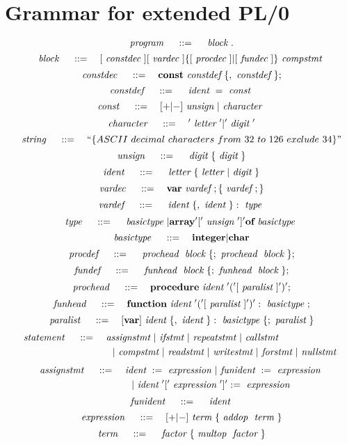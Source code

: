 \section{Grammar for extended PL/0}
\label{sec:gfepl0}

\[
	~\emph{program}~ \quad ::= \quad 
		~\emph{block}~.
\]
\[
	~\emph{block}~ \quad ::= \quad 
		[~\emph{constdec}~] [~\emph{vardec}~] \{[~\emph{procdec}~] | [~\emph{fundec}~]\} ~\emph{compstmt}~
\]
\[
	~\emph{constdec}~ \quad ::= \quad
		\textbf{const} ~\emph{constdef}~ \{,~\emph{constdef}~\};	
\]
\[
	~\emph{constdef}~ \quad ::= \quad
		~\emph{ident}~ = ~\emph{const}~
\]
\[
	~\emph{const}~ \quad ::= \quad
		[+|-]~\emph{unsign}~|~\emph{character}~
\]
\[
	~\emph{character}~ \quad ::= \quad
		'~\emph{letter}~' | '~\emph{digit}~'
\]
\[
	~\emph{string}~ \quad ::= \quad
		``\{ASCII~decimal~characters~from~32~to~126~exclude~34\}"
\]
\[
	~\emph{unsign}~ \quad ::= \quad
		~\emph{digit}~ \{~\emph{digit}~\}
\]
\[
	~\emph{ident}~ \quad ::= \quad
		~\emph{letter}~ \{ ~\emph{letter}~ | ~\emph{digit}~ \}
\]
\[
	~\emph{vardec}~ \quad ::= \quad
		\textbf{var} ~\emph{vardef}~; \{ ~\emph{vardef}~; \}
\]
\[
	~\emph{vardef}~ \quad ::= \quad
		~\emph{ident}~\{,~\emph{ident}~\}:~\emph{type}~
\]
\[
	~\emph{type}~ \quad ::= \quad
		~\emph{basictype}~ | \textbf{array} '['~\emph{unsign}~']' \textbf{of} ~\emph{basictype}~
\]
\[
	~\emph{basictype}~ \quad ::= \quad
		\textbf{integer} | \textbf{char}
\]
\[
	~\emph{procdef}~ \quad ::= \quad
		~\emph{prochead}~ ~\emph{block}~ \{; ~\emph{prochead}~ ~\emph{block}~ \};
\]
\[
	~\emph{fundef}~ \quad ::= \quad
		~\emph{funhead}~ ~\emph{block}~ \{; ~\emph{funhead}~ ~\emph{block}~ \};
\]
\[
	~\emph{prochead}~ \quad ::= \quad
		\textbf{procedure} ~\emph{ident}~ '(' [~\emph{paralist}~] ')';
\]
\[
	~\emph{funhead}~ \quad ::= \quad
		\textbf{function} ~\emph{ident}~ '(' [~\emph{paralist}~] ')': ~\emph{basictype}~;
\]
\[
	~\emph{paralist}~ \quad ::= \quad
		[ \textbf{var} ] ~\emph{ident}~ \{, ~\emph{ident}~ \}: ~\emph{basictype}~ \{; ~\emph{paralist}~ \}
\]
\[ \begin{aligned}
	~\emph{statement}~ \quad ::= \quad
		& ~\emph{assignstmt}~ | ~\emph{ifstmt}~ | ~\emph{repeatstmt}~ | ~\emph{callstmt}~ \\
		& \quad | ~\emph{compstmt}~ | ~\emph{readstmt}~ | ~\emph{writestmt}~ | ~\emph{forstmt}~ | ~\emph{nullstmt}~
\end{aligned} \]
\[ \begin{aligned}
	~\emph{assignstmt}~ \quad ::= \quad
		& ~\emph{ident}~ := ~\emph{expression}~ | ~\emph{funident}~ := ~\emph{expression}~  \\
		& \quad | ~\emph{ident}~ '[' ~\emph{expression}~ ']' := ~\emph{expression}~
\end{aligned} \]
\[
	~\emph{funident}~ \quad ::= \quad
		~\emph{ident}~
\]
\[
	~\emph{expression}~ \quad ::= \quad
		[+|-] ~\emph{term}~ \{ ~\emph{addop}~ ~\emph{term}~ \}
\]
\[
	~\emph{term}~ \quad ::= \quad
		~\emph{factor}~ \{ ~\emph{multop}~ ~\emph{factor}~ \}
\]
